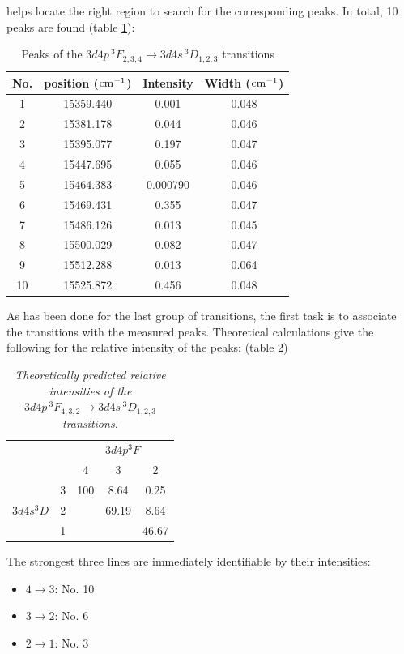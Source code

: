 \documentclass[a4paper]{article}
\begin{document}
helps locate the right region to search for the corresponding peaks. In total, 10 peaks are
found (table \ref{tab:transitions2}):
\begin{table}[htb!]
\centering
\begin{tabular}{c|c|c|c}
\hline
No. & position ($\rm cm^{-1}$) & Intensity & Width ($\rm cm^{-1}$) \\
\hline
1 & 15359.440 & 0.001 & 0.048 \\
2 & 15381.178 & 0.044 & 0.046 \\
3 & 15395.077 & 0.197 & 0.047 \\
4 & 15447.695 & 0.055 & 0.046 \\
5 & 15464.383 & 0.000790 & 0.046 \\
6 & 15469.431 & 0.355 & 0.047 \\
7 & 15486.126 & 0.013 & 0.045 \\
8 & 15500.029 & 0.082 & 0.047 \\
9 & 15512.288 & 0.013 & 0.064 \\
10 & 15525.872 & 0.456 & 0.048 \\
\hline
\end{tabular}
\caption{Peaks of the $3d4p\,^3F_{2,3,4} \to 3d4s\,^3D_{1,2,3}$ transitions}
\label{tab:transitions2}
\end{table}

As has been done for the last group of transitions, the first task is to associate
the transitions with the measured peaks.  Theoretical calculations give the following
for the relative intensity of the peaks: (table \ref{tab:intensity2})
\begin{table}[htb!]
\centering
\begin{tabular}{cc|c|c|c|}
\cline{3-5}
& & \multicolumn{3}{c|}{$3d4p ^3F$}\\
\cline{3-5}
& & 4 & 3 & 2\\
\hline
\multicolumn{1}{|c|}{\multirow{3}{*}{$3d4s ^3D$}} & 3 & 100 & 8.64 & 0.25\\
\multicolumn{1}{|c|}{} & 2 &  & 69.19 & 8.64 \\
\multicolumn{1}{|c|}{} & 1 & & & 46.67 \\
\hline
\end{tabular}
\caption{\it Theoretically predicted relative intensities of the
  $3d4p\,^3F_{4,3,2} \to 3d4s\,^3D_{1,2,3}$ transitions.}
\label{tab:intensity2}
\end{table}

The strongest three lines are immediately identifiable by their
intensities:
\begin{itemize}
\item $4 \to 3$: No. 10
\item $3 \to 2$: No. 6
\item $2 \to 1$: No. 3
\end{itemize}
\end{document}
